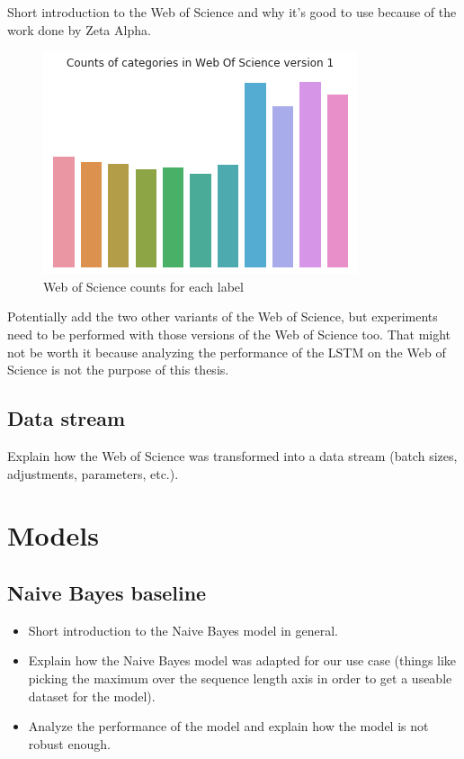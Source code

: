 \documentclass[12pt]{extreport}
\begin{document}
Short introduction to the Web of Science and why it's good to use because of the work done by Zeta Alpha.

\begin{figure}[ht!]
\centering
\includegraphics[width=0.8\linewidth]{assets/framework/wos_counts_1.png}
\caption{Web of Science counts for each label}
\label{fig:wos-1}
\end{figure}

Potentially add the two other variants of the Web of Science, but experiments need to be performed with those versions of the Web of Science too. That might not be worth it because analyzing the performance of the LSTM on the Web of Science is not the purpose of this thesis.

\subsection{Data stream}

Explain how the Web of Science was transformed into a data stream (batch sizes, adjustments, parameters, etc.).

\section{Models}

\subsection{Naive Bayes baseline}

\begin{itemize}
    \item Short introduction to the Naive Bayes model in general.
    \item Explain how the Naive Bayes model was adapted for our use case (things like picking the maximum over the sequence length axis in order to get a useable dataset for the model).
    \item Analyze the performance of the model and explain how the model is not robust enough.
\end{itemize}
\end{document}
